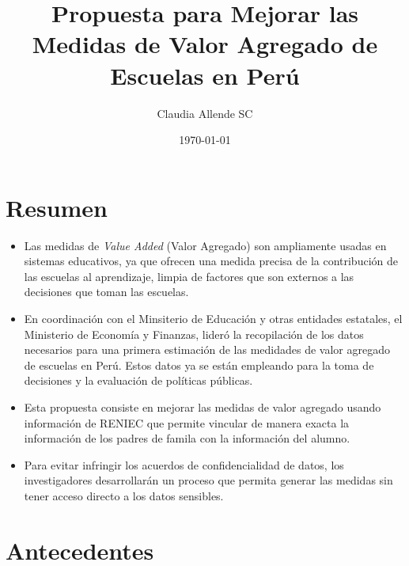 \documentclass[11pt]{article}
\numberwithin{equation}{section}
\begin{document}
\vspace{-6cm}
\title{{\bf {\Large Propuesta para Mejorar las Medidas de Valor Agregado de Escuelas en Per\'u}}}
\author{Claudia Allende SC}
\vspace{-6cm}
\date{\today}
\maketitle

\section*{Resumen}

\begin{itemize}

\item Las medidas de {\it Value Added} (Valor Agregado) son ampliamente usadas en sistemas educativos, ya que ofrecen una medida precisa de la contribuci\'on de las escuelas al aprendizaje, limpia de factores que son externos a las decisiones que toman las escuelas.
\item En coordinaci\'on con el Minsiterio de Educaci\'on y otras entidades estatales, el Ministerio de Econom\'ia y Finanzas, lider\'o la recopilaci\'on de los datos necesarios para una primera estimaci\'on de las medidades de valor agregado de escuelas en Per\'u. Estos datos ya se est\'an empleando para la toma de decisiones y la evaluaci\'on de pol\'iticas p\'ublicas.
\item Esta propuesta consiste en mejorar las medidas de valor agregado usando informaci\'on de RENIEC que permite vincular de manera exacta la informaci\'on  de los padres de famila con la informaci\'on del alumno.
\item Para evitar infringir los acuerdos de confidencialidad de datos, los investigadores desarrollar\'an un proceso que permita generar las medidas sin tener acceso directo a los datos sensibles.

\end{itemize}	

\section{Antecedentes}
\end{document}

